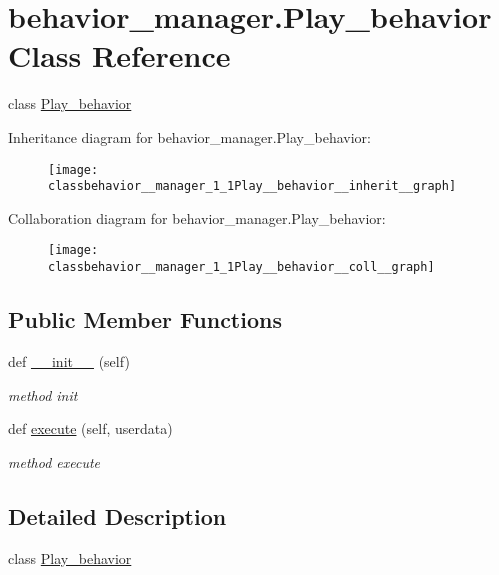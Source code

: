 \hypertarget{classbehavior__manager_1_1Play__behavior}{}\section{behavior\+\_\+manager.\+Play\+\_\+behavior Class Reference}
\label{classbehavior__manager_1_1Play__behavior}


class \hyperlink{classbehavior__manager_1_1Play__behavior}{Play\+\_\+behavior}  




Inheritance diagram for behavior\+\_\+manager.\+Play\+\_\+behavior\+:\nopagebreak
\begin{figure}[H]
\begin{center}
\leavevmode
\texttt{[image: classbehavior\_\_manager\_1\_1Play\_\_behavior\_\_inherit\_\_graph]}
\end{center}
\end{figure}


Collaboration diagram for behavior\+\_\+manager.\+Play\+\_\+behavior\+:\nopagebreak
\begin{figure}[H]
\begin{center}
\leavevmode
\texttt{[image: classbehavior\_\_manager\_1\_1Play\_\_behavior\_\_coll\_\_graph]}
\end{center}
\end{figure}
\subsection*{Public Member Functions}
\begin{DoxyCompactItemize}
\item 
def \hyperlink{classbehavior__manager_1_1Play__behavior_aaa6ce2b1855d0a235e324df41d8519a1}{\+\_\+\+\_\+init\+\_\+\+\_\+} (self)
\begin{DoxyCompactList}\small\item\em method init \end{DoxyCompactList}\item 
def \hyperlink{classbehavior__manager_1_1Play__behavior_a6c5231ed8f406c82e06c741e89b0f666}{execute} (self, userdata)
\begin{DoxyCompactList}\small\item\em method execute \end{DoxyCompactList}\end{DoxyCompactItemize}


\subsection{Detailed Description}
class \hyperlink{classbehavior__manager_1_1Play__behavior}{Play\+\_\+behavior} 

